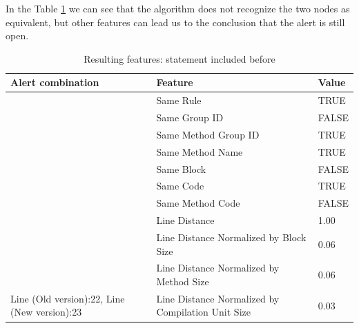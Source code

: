 \documentclass[
]{article}
\begin{document}
\newpage

In the Table \ref{nested_in_other_if} we can see that the algorithm does
not recognize the two nodes as equivalent, but other features can lead
us to the conclusion that the alert is still open.

\small

\begin{table}[!h]

\caption{\label{tab:unnamed-chunk-14}Resulting features: statement included before \label{nested_in_other_if} }
\centering
\begin{tabular}[t]{l|l|l}
\hline
Alert combination & Feature & Value\\
\hline
\rowcolor{gray!6}   & Same Rule & TRUE\\

 & Same Group ID & FALSE\\

\rowcolor{gray!6}   & Same Method Group ID & TRUE\\

 & Same Method Name & TRUE\\

\rowcolor{gray!6}   & Same Block & FALSE\\

 & Same Code & TRUE\\

\rowcolor{gray!6}   & Same Method Code & FALSE\\

 & Line Distance & 1.00\\

\rowcolor{gray!6}   & Line Distance Normalized by Block Size & 0.06\\

 & Line Distance Normalized by Method Size & 0.06\\

\multirow[t]{-11}{*}{\raggedright\arraybackslash Line (Old version):22, Line (New version):23} & Line Distance Normalized by Compilation Unit Size & 0.03\\
\hline
\end{tabular}
\end{table}

\normalsize

\newpage
\end{document}
